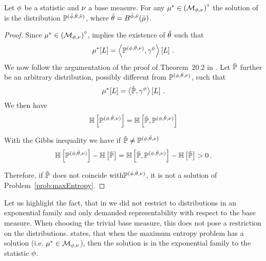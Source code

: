 \begin{theorem}\label{the:maxEntInterior}
	Let $\phi$ be a statistic and $\nu$ a base measure.
 	For any $\mu^*\in{\left(\mathcal{M}_{\phi,\nu}\right)}^{\circ}$ the solution of  is the distribution $\mathbb{P}^{(\tilde{\phi},\hat{\theta},\tilde{\nu})}$, where $\hat{\theta}=B^{\tilde{\phi},\tilde{\nu}}(\tilde{\mu})$.
\end{theorem}
\begin{proof}
	Since $\mu^*\in{\left(\mathcal{M}_{\phi,\nu}\right)}^{\circ}$,  implies the existence of $\hat{\theta}$ such that 
		\[ \mu^*[L] = \left\langle \mathbb{P}^{(\phi,\hat{\theta},\nu)},\gamma^{\phi}\right\rangle \left[ L \right]   \, . \]
	We now follow the argumentation of the proof of Theorem~20.2 in \cite{koller_probabilistic_2009}.
	Let $\tilde{\mathbb{P}}$ further be an arbitrary distribution, possibly different from $\mathbb{P}^{(\phi,\hat{\theta},\nu)}$, such that
		\[ \mu^*[L] = \left\langle \tilde{\mathbb{P}},\gamma^{\phi}\right\rangle \left[ L \right]  \, . \]
	We then have
	\begin{align*}
		\mathbb{H}\left[\mathbb{P}^{(\phi,\hat{\theta},\nu)}\right]
		= \mathbb{H}\left[\tilde{\mathbb{P}},\mathbb{P}^{(\phi,\hat{\theta},\nu)}\right]
	\end{align*}
	
	With the Gibbs inequality we have if $\tilde{\mathbb{P}}\neq\mathbb{P}^{(\phi,\hat{\theta},\nu)}$
	\begin{align*}
		\mathbb{H}\left[\mathbb{P}^{(\phi,\hat{\theta},\nu)}\right] - \mathbb{H}\left[\tilde{\mathbb{P}}\right]
		= \mathbb{H}\left[\tilde{\mathbb{P}},\mathbb{P}^{(\phi,\hat{\theta},\nu)}\right] - \mathbb{H}\left[\tilde{\mathbb{P}}\right] > 0 \, . 
	\end{align*}	
	
	Therefore, if $\tilde{\mathbb{P}}$ does not coincide with$\mathbb{P}^{(\phi,\hat{\theta},\nu)}$, it is not a solution of Problem~\ref{prob:maxEntropy}.
\end{proof}

Let us highlight the fact, that in  we did not restrict to distributions in an exponential family and only demanded representability with respect to the base measure.
When choosing the trivial base measure, this does not pose a restriction on the distributions.
 states, that when the maximum entropy problem has a solution (i.e. $\mu^*\in\mathcal{M}_{\phi,\nu}$), then the solution is in the exponential family to the statistic $\phi$.

